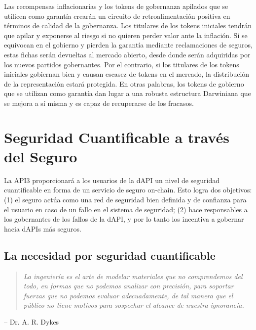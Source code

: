 \documentclass[11pt]{article}
\begin{document}
Las recompensas inflacionarias y los tokens de gobernanza apilados que se utilicen como garantía crearán un circuito de retroalimentación positiva en términos de calidad de la gobernanza. Los titulares de los tokens iniciales tendrán que apilar y exponerse al riesgo si no quieren perder valor ante la inflación. Si se equivocan en el gobierno y pierden la garantía mediante reclamaciones de seguros, estas fichas serán devueltas al mercado abierto, desde donde serán adquiridas por los nuevos partidos gobernantes. Por el contrario, si los titulares de los tokens iniciales gobiernan bien y causan escasez de tokens en el mercado, la distribución de la representación estará protegida. En otras palabras, los tokens de gobierno que se utilizan como garantía dan lugar a una robusta estructura Darwiniana que se mejora a sí misma y es capaz de recuperarse de los fracasos.



\section{Seguridad Cuantificable a través del Seguro}
\label{sec:quantifiable-security-through-insurance}

La API3 proporcionará a los usuarios de la dAPI un nivel de seguridad cuantificable en forma de un servicio de seguro on-chain. Esto logra dos objetivos: (1) el seguro actúa como una red de seguridad bien definida y de confianza para el usuario en caso de un fallo en el sistema de seguridad; (2) hace responsables a los gobernantes de los fallos de la dAPI, y por lo tanto los incentiva a gobernar hacia dAPIs más seguros.

\subsection{La necesidad por seguridad cuantificable}
\label{sec:the-need-for-quantifiable-security}

\begin{quote}
\it
La ingeniería es el arte de modelar materiales que no comprendemos del todo, en formas que no podemos analizar con precisión, para soportar fuerzas que no podemos evaluar adecuadamente, de tal manera que el público no tiene motivos para sospechar el alcance de nuestra ignorancia.
\end{quote}
\begin{flushright}
-- Dr. A. R. Dykes
\end{flushright}
\end{document}
